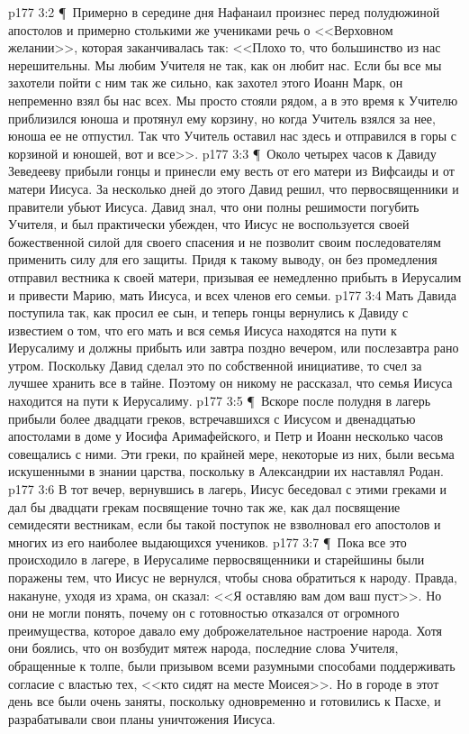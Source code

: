 \vs p177 3:2 \P\ Примерно в середине дня Нафанаил произнес перед полудюжиной апостолов и примерно столькими же учениками речь о <<Верховном желании>>, которая заканчивалась так: <<Плохо то, что большинство из нас нерешительны. Мы любим Учителя не так, как он любит нас. Если бы все мы захотели пойти с ним так же сильно, как захотел этого Иоанн Марк, он непременно взял бы нас всех. Мы просто стояли рядом, а в это время к Учителю приблизился юноша и протянул ему корзину, но когда Учитель взялся за нее, юноша ее не отпустил. Так что Учитель оставил нас здесь и отправился в горы с корзиной и юношей, вот и все>>.
\vs p177 3:3 \P\ Около четырех часов к Давиду Зеведееву прибыли гонцы и принесли ему весть от его матери из Вифсаиды и от матери Иисуса. За несколько дней до этого Давид решил, что первосвященники и правители убьют Иисуса. Давид знал, что они полны решимости погубить Учителя, и был практически убежден, что Иисус не воспользуется своей божественной силой для своего спасения и не позволит своим последователям применить силу для его защиты. Придя к такому выводу, он без промедления отправил вестника к своей матери, призывая ее немедленно прибыть в Иерусалим и привести Марию, мать Иисуса, и всех членов его семьи.
\vs p177 3:4 Мать Давида поступила так, как просил ее сын, и теперь гонцы вернулись к Давиду с известием о том, что его мать и вся семья Иисуса находятся на пути к Иерусалиму и должны прибыть или завтра поздно вечером, или послезавтра рано утром. Поскольку Давид сделал это по собственной инициативе, то счел за лучшее хранить все в тайне. Поэтому он никому не рассказал, что семья Иисуса находится на пути к Иерусалиму.
\vs p177 3:5 \P\ Вскоре после полудня в лагерь прибыли более двадцати греков, встречавшихся с Иисусом и двенадцатью апостолами в доме у Иосифа Аримафейского, и Петр и Иоанн несколько часов совещались с ними. Эти греки, по крайней мере, некоторые из них, были весьма искушенными в знании царства, поскольку в Александрии их наставлял Родан.
\vs p177 3:6 В тот вечер, вернувшись в лагерь, Иисус беседовал с этими греками и дал бы двадцати грекам посвящение точно так же, как дал посвящение семидесяти вестникам, если бы такой поступок не взволновал его апостолов и многих из его наиболее выдающихся учеников.
\vs p177 3:7 \P\ Пока все это происходило в лагере, в Иерусалиме первосвященники и старейшины были поражены тем, что Иисус не вернулся, чтобы снова обратиться к народу. Правда, накануне, уходя из храма, он сказал: <<Я оставляю вам дом ваш пуст>>. Но они не могли понять, почему он с готовностью отказался от огромного преимущества, которое давало ему доброжелательное настроение народа. Хотя они боялись, что он возбудит мятеж народа, последние слова Учителя, обращенные к толпе, были призывом всеми разумными способами поддерживать согласие с властью тех, <<кто сидят на месте Моисея>>. Но в городе в этот день все были очень заняты, поскольку одновременно и готовились к Пасхе, и разрабатывали свои планы уничтожения Иисуса.
